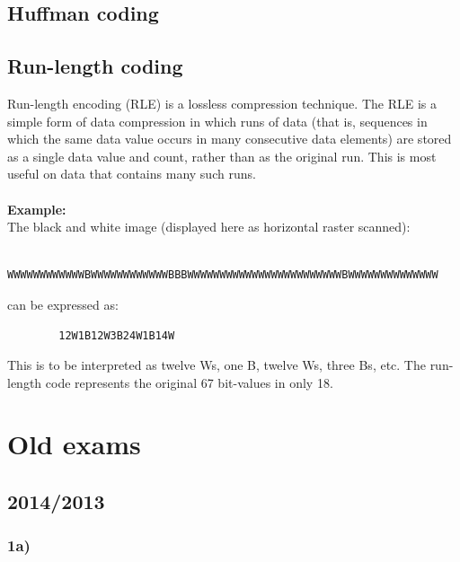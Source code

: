 \documentclass[12pt]{article}
\begin{document}
    \subsection{Huffman coding}
    \subsection{Run-length coding}
    Run-length encoding (RLE) is a lossless compression technique. The RLE is a simple form of data compression in which runs of data (that
    is, sequences in which the same data value occurs in many consecutive data elements) are stored
    as a single data value and count, rather than as the original run. This is most useful on data 
    that contains many such runs. \\
    \\
    \textbf{Example:}\\
    The black and white image (displayed here as horizontal raster scanned):
    \begin{verbatim}
        WWWWWWWWWWWWBWWWWWWWWWWWWBBBWWWWWWWWWWWWWWWWWWWWWWWWBWWWWWWWWWWWWWW
    \end{verbatim}
    can be expressed as:
    \begin{verbatim}
        12W1B12W3B24W1B14W
    \end{verbatim}
        This is to be interpreted as twelve Ws, one B, twelve Ws, three Bs, etc.
        The run-length code represents the original 67 bit-values in only 18.    
%	
%	
\section{Old exams}
	\subsection{2014/2013}
	\subsubsection*{1a)}
	
\end{document}
